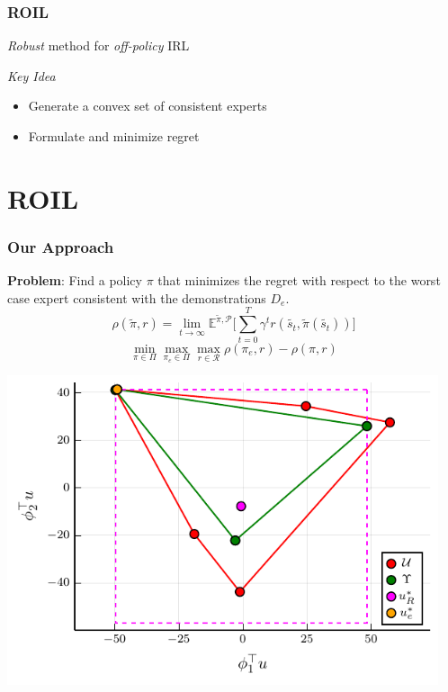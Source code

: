 \documentclass{beamer}
\begin{document}
\begin{frame}
	\frametitle{ROIL}
	\emph{Robust} method for \emph{off-policy} IRL

	\vfill
	\emph{Key Idea}
  \begin{itemize}
    \item Generate a convex set of consistent experts
    \item Formulate and minimize regret
  \end{itemize}
\end{frame}

\section*{ROIL}

\begin{frame}
	\frametitle{Our Approach}
	\textbf{Problem}: Find a policy $\pi$ that minimizes the regret with respect to the worst case expert consistent with the demonstrations $D_e$.
	\[ \rho(\tilde{\pi}, r) = \lim_{t \to \infty} \mathbb{E}^{\tilde{\pi}, \mathcal{P}} \lbrack \sum_{t=0}^T \gamma^t r(\tilde{s_t}, \tilde{\pi}(\tilde{s_t})) \rbrack \]
	\[ \min_{\pi \in \Pi} \max_{\pi_e \in \Pi} \max_{r \in \mathcal{R}} \rho(\pi_e, r) - \rho(\pi, r)\]
\end{frame}

\begin{frame}
  \vfill
  \begin{center}
	  \includegraphics[width=0.95\textwidth, height=0.85\textheight]{../../pres_roil/plots/visual_solve_cheb.pdf}
  \end{center}
\end{frame}
\end{document}

